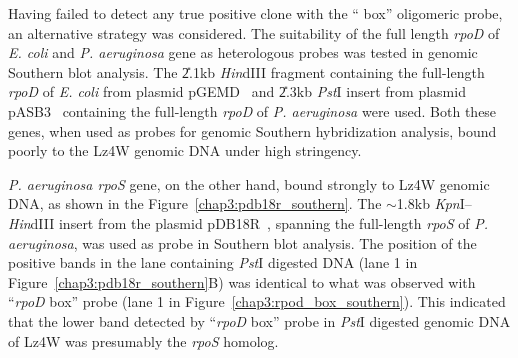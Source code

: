 Having failed to detect any true positive clone with the
`` box'' oligomeric probe, an alternative strategy was
considered. The suitability of the full length \emph{rpoD} of
\emph{E. coli} and \emph{P. aeruginosa} gene as heterologous
probes was tested in genomic Southern blot analysis. The
\U{2.1}{kb} \emph{Hin}dIII fragment containing the full-length
\emph{rpoD} of \emph{E. coli} from plasmid
pGEMD~\citep{Igarashi1991} and \U{2.3}{kb} \emph{Pst}I insert from
plasmid pASB3~\citep{Tanaka1991} containing the full-length
\emph{rpoD} of \emph{P. aeruginosa} were used. Both these genes,
when used as probes for genomic Southern hybridization analysis,
bound poorly to the Lz4W genomic DNA under high stringency.

\emph{P. aeruginosa rpoS} gene, on the other hand, bound strongly
to Lz4W genomic DNA, as shown in the
Figure~\ref{chap3:pdb18r_southern}. The \U{$\sim$1.8}{kb}
\emph{Kpn}I--\emph{Hin}dIII insert from the plasmid
pDB18R~\citep{Fujita1994}, spanning the full-length \emph{rpoS} of
\emph{P. aeruginosa}, was used as probe in Southern blot analysis.
The position of the positive bands in the lane containing
\emph{Pst}I digested DNA (lane 1 in
Figure~\ref{chap3:pdb18r_southern}B) was identical to what was
observed with ``\emph{rpoD} box'' probe (lane 1 in
Figure~\ref{chap3:rpod_box_southern}). This indicated that the
lower band detected by ``\emph{rpoD} box'' probe in \emph{Pst}I
digested genomic DNA of Lz4W was presumably the \emph{rpoS}
homolog.

